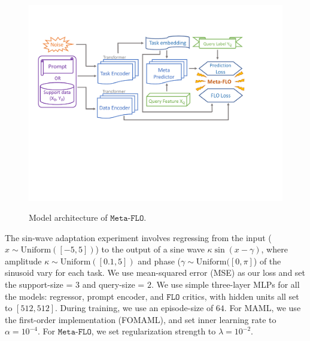 \documentclass{article}
\theoremstyle{plain}
\theoremstyle{definition}
\theoremstyle{remark}
\newcommand{\FLO}{\texttt{FLO}}
\newcommand{\metaflo}{\texttt{Meta-FLO}}
\begin{document}
				
				\begin{figure}[t!]
					\begin{center}
						{
							\includegraphics[width=.7\textwidth]{figures/meta/metaflo-arch}
						}
					\end{center}
					\vspace{-1.em}
					\caption{Model architecture of $\metaflo$. \label{fig:arch}}
					\vspace{-1.em}
				\end{figure}
				
				The sin-wave adaptation experiment involves regressing from the input ($x\sim \text{Uniform}([-5,5])$) to the output of a sine wave $\kappa \sin(x-\gamma)$, where amplitude $\kappa \sim \text{Uniform}([0.1,5])$ and phase ($\gamma \sim \text{Uniform}([0,\pi]$) of the sinusoid vary for each task. We use mean-squared error (MSE) as our loss and set the support-size = $3$ and query-size = $2$. We use simple three-layer MLPs for all the models: regressor, prompt encoder, and $\FLO$ critics, with hidden units all set to $[512, 512]$. During training, we use an episode-size of $64$. For MAML, we use the first-order implementation (FOMAML), and set inner learning rate to $\alpha=10^{-4}$. For $\metaflo$, we set regularization strength to $\lambda=10^{-2}$.
				
\end{document}
